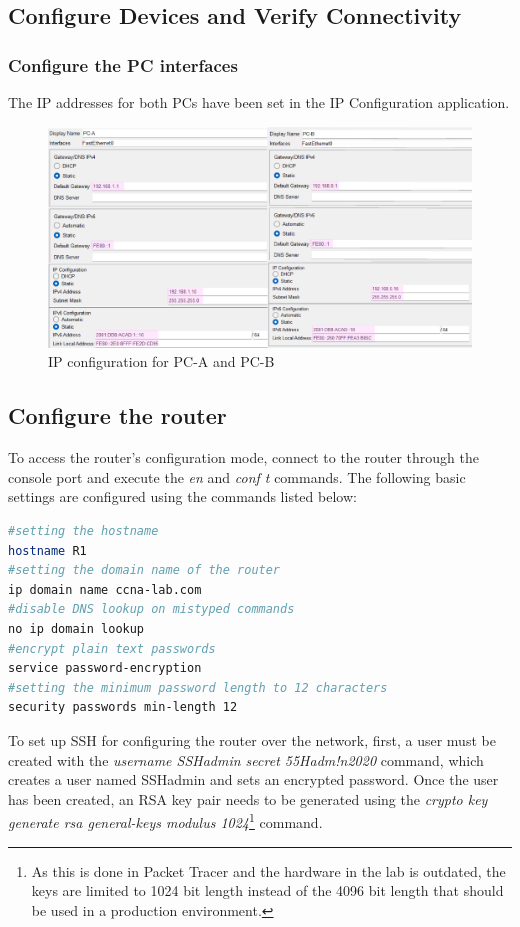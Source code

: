 \documentclass[a4paper]{article}
\newcommand{\abc}{\hfill \break}
\newcommand{\ii}{\textit}
\begin{document}
\subsection{Configure Devices and Verify Connectivity}
\subsubsection{Configure the PC interfaces}
The IP addresses for both PCs have been set in the IP Configuration application.
\begin{figure}[h]
	\includegraphics[scale=0.45]{images/pc-ipconf.png}
	\centering
	\caption{IP configuration for PC-A and PC-B}
\end{figure}
\newpage
\subsection{Configure the router}
To access the router's configuration mode, connect to the router through the console port and execute the \ii{en} and \ii{conf t} commands.\abc
The following basic settings are configured using the commands listed below:
\begin{lstlisting}[language=bash,
	keywordstyle=\color{black},
	rulecolor=\color{blue}]
#setting the hostname
hostname R1
#setting the domain name of the router
ip domain name ccna-lab.com
#disable DNS lookup on mistyped commands
no ip domain lookup
#encrypt plain text passwords
service password-encryption
#setting the minimum password length to 12 characters
security passwords min-length 12
\end{lstlisting}
To set up SSH for configuring the router over the network, first, a user must be created with the \ii{username SSHadmin secret 55Hadm!n2020} command, which creates a user named SSHadmin and sets an encrypted password.\abc
Once the user has been created, an RSA key pair needs to be generated using the \ii{crypto key generate rsa general-keys modulus 1024}\footnote{As this is done in Packet Tracer and the hardware in the lab is outdated, the keys are limited to 1024 bit length instead of the 4096 bit length that should be used in a production environment.} command.
\end{document}
